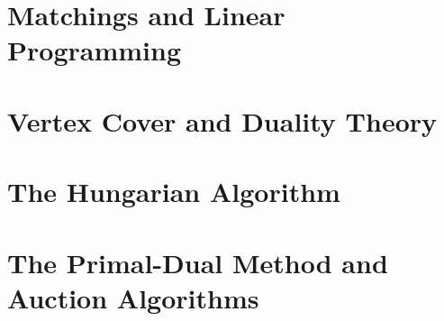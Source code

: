 \documentclass[12pt,twoside]{reedthesis}
\renewcommand{\'}{^{'}}
\theoremstyle{plain}
\theoremstyle{definition}
\begin{document}
	
	
\chapter{Matchings and Linear Programming}



\chapter{Vertex Cover and Duality Theory}



\chapter{The Hungarian Algorithm}



\chapter{The Primal-Dual Method and Auction Algorithms}


	

\backmatter %

\nocite{*}


\end{document}
